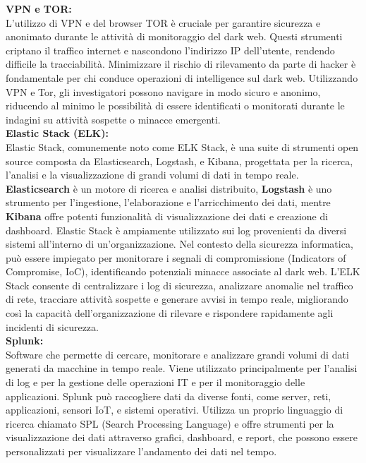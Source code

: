 \textbf{VPN e TOR:}\\
L'utilizzo di VPN e del browser TOR è cruciale per garantire sicurezza e anonimato durante le attività di monitoraggio del dark web. Questi strumenti criptano il traffico internet e nascondono l'indirizzo IP dell'utente, rendendo difficile la tracciabilità.
Minimizzare il rischio di rilevamento da parte di hacker è fondamentale per chi conduce operazioni di intelligence sul dark web. Utilizzando VPN e Tor, gli investigatori possono navigare in modo sicuro e anonimo, riducendo al minimo le possibilità di essere identificati o monitorati durante le indagini su attività sospette o minacce emergenti.\\


\textbf{Elastic Stack (ELK):}\\
Elastic Stack, comunemente noto come ELK Stack, è una suite di strumenti open source composta da Elasticsearch, Logstash, e Kibana, progettata per la ricerca, l'analisi e la visualizzazione di grandi volumi di dati in tempo reale. \textbf{Elasticsearch} è un motore di ricerca e analisi distribuito, \textbf{Logstash} è uno strumento per l'ingestione, l'elaborazione e l'arricchimento dei dati, mentre \textbf{Kibana} offre potenti funzionalità di visualizzazione dei dati e creazione di dashboard.
Elastic Stack è ampiamente utilizzato sui log provenienti da diversi sistemi all'interno di un'organizzazione. Nel contesto della sicurezza informatica, può essere impiegato per monitorare i segnali di compromissione (Indicators of Compromise, IoC), identificando potenziali minacce associate al dark web. L'ELK Stack consente di centralizzare i log di sicurezza, analizzare anomalie nel traffico di rete, tracciare attività sospette e generare avvisi in tempo reale, migliorando così la capacità dell'organizzazione di rilevare e rispondere rapidamente agli incidenti di sicurezza.\\


\textbf{Splunk:}\\
Software che permette di cercare, monitorare e analizzare grandi volumi di dati generati da macchine in tempo reale. Viene utilizzato principalmente per l'analisi di log e per la gestione delle operazioni IT e per il monitoraggio delle applicazioni.
Splunk può raccogliere dati da diverse fonti, come server, reti, applicazioni, sensori IoT, e sistemi operativi. Utilizza un proprio linguaggio di ricerca chiamato SPL (Search Processing Language) e offre strumenti per la visualizzazione dei dati attraverso grafici, dashboard, e report, che possono essere personalizzati per visualizzare l’andamento dei dati nel tempo.\\


